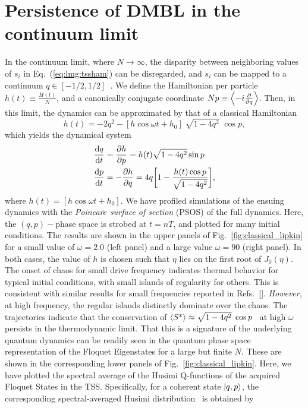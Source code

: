 \documentclass[%
reprint,
superscriptaddress,
amsmath,amssymb,
aps,
prb,
showkeys,
]{revtex4-2}
\begin{document}
\section{\label{sec:level4}Persistence of DMBL in the continuum limit}
In the continuum limit, where $N\rightarrow\infty$, the disparity between neighboring values of $s_i$ in Eq.~(\ref{eq:lmg:tssham}) can be disregarded, and $s_i$ can be mapped to a continuum $q\in \left[-1/2, 1/2\right]$~\cite{mori_prethermalization_2019}. We define	the Hamiltonian per particle $h(t)\equiv \frac{H(t)}{N}$, and a canonically conjugate coordinate $Np\equiv \expval{-i\pdv{}{q}}$. Then, in this limit, the dynamics can be approximated by that of a classical Hamiltonian~\cite{sciolla_quantum_2010}
\begin{equation}
	h(t) = -2 q^2 - \left[h\cos{\omega t} + h_0\right]\;\sqrt{1-4q^2}\;\cos{p},
	\label{eq:class:ham}
\end{equation}
which yields the dynamical system 
\begin{align}
	\dv{q}{t} &= \pdv{h}{p} = h(t)\sqrt{1-4q^2}\sin{p}\nonumber \\
	\dv{p}{t} &= -\pdv{h}{q} = 4q\bigg[1-\frac{h(t)\cos{p}}{\sqrt{1-4q^2}}\bigg],
	\label{eq:class:poinc}
\end{align}
where $h(t) = \left[h\cos{\omega t} + h_0\right]$. We have profiled simulations of the ensuing dynamics with the \emph{Poincar$\acute{e}$ surface of section} (PSOS) of the full dynamics. Here, the $\left(q,p\right)-$phase space is strobed at $t=nT$, and plotted for many initial conditions. The results are shown in the upper panels of Fig.~\ref{fig:classical_lipkin} for a small value of $\omega=2.0$ (left panel) and a large value $\omega=90$ (right panel). In both cases, the value of $h$ is chosen such that $\eta$ lies on the first root of $J_0(\eta)$. The onset of chaos for small drive frequency indicates thermal behavior for typical initial conditions, with small islands of regularity for others. This is consistent with similar results for small frequencies reported in Refs.~[\cite{russomanno_thermalization_2015, Kidd2019}]. \emph{However,} at high frequency, the regular islands distinctly dominate over the chaos. The trajectories indicate that the conservation of $\expval{S^x}\approx \sqrt{1-4q^2}\;\cos{p}$~\cite{mori_prethermalization_2019} at high $\omega$ persists in the thermodynamic limit.
That this is a signature of the underlying quantum dynamics can be readily seen in the quantum phase space representation of the Floquet Eigenstates for a large but finite $N$. These are shown in the corresponding lower panels of Fig.~\ref{fig:classical_lipkin}. Here, we have plotted the spectral average of the Husimi Q-functions of the acquired Floquet States in the TSS. Specifically, for a coherent state $\ket{q,p}$, the corresponding spectral-averaged Husimi distribution~\cite{husimi} is obtained by 
\end{document}
